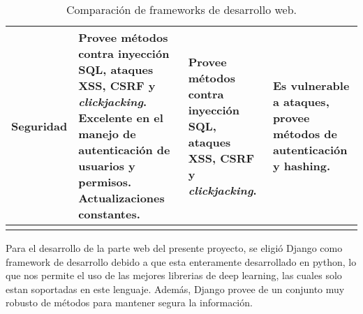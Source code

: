 \begin{center}
\begin{longtable}{|m{3.5cm}|m{3.5cm}|m{3.5cm}|m{3.5cm}|}
    \hline
    Seguridad                                           &
    Provee métodos contra inyección SQL, ataques XSS, CSRF y \textit{clickjacking}. Excelente en el manejo de autenticación de usuarios y permisos. Actualizaciones constantes. &
    Provee métodos contra inyección SQL, ataques XSS, CSRF y \textit{clickjacking}.                              &
    Es vulnerable a ataques, provee métodos de autenticación y hashing. \\
    
    \hline
    \caption{Comparación de frameworks de desarrollo web.}
    \label{tbl:analisis-frameworks}
    
    \end{longtable}
\end{center}

Para el desarrollo de la parte web del presente proyecto, se eligió Django como framework de desarrollo debido a que esta enteramente desarrollado en python, lo que nos permite el uso de las mejores librerias de deep learning, las cuales solo estan soportadas en este lenguaje. Además, Django provee de un conjunto muy robusto de métodos para mantener segura la información.

